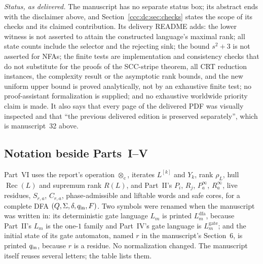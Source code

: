 \documentclass[11pt,letterpaper]{article}
\theoremstyle{definition}
\theoremstyle{remark}
\newcommand{\rec}{\operatorname{Rec}}
\newcommand{\cut}{\otimes_{\mathrm c}}
\newcommand{\gen}[2]{#1^{[#2]}}
\newcommand{\rank}{\rho}
\newcommand{\Lgate}[1]{L^{\mathrm{gate}}_{#1}}
\newcommand{\Ldfa}[1]{L^{\mathrm{dfa}}_{#1}}
\begin{document}
\emph{Status, as delivered.} The manuscript has no separate status box; its
abstract ends with the disclaimer above, and
Section~\ref{ccc:dc:sec:checks} states the scope of its checks and its
claimed contribution. Its delivery README adds: the lower witness is not
asserted to attain the constructed language's maximal rank; all state counts
include the selector and the rejecting sink; the bound $s^2+3$ is not
asserted for NFAs; the finite tests are implementation and consistency
checks that do not substitute for the proofs of the SCC-stripe theorem, all
CRT reduction instances, the complexity result or the asymptotic rank
bounds, and the new uniform upper bound is proved analytically, not by an
exhaustive finite test; no proof-assistant formalization is supplied; and no
exhaustive worldwide priority claim is made. It also says that every page of
the delivered PDF was visually inspected and that ``the previous delivered
edition is preserved separately'', which is manuscript~32 above.

\subsection{Notation beside Parts~I--V}\label{ccc:dc:sec:notation}

Part~VI uses the report's operation $\cut$, iterates $\gen Lk$ and $Y_k$,
rank $\rank_L$, hull $\rec(L)$ and supremum rank $R(L)$, and Part~II's
$P_i$, $R_j$, $P^\infty_a$, $R^\infty_a$, live residues, $S_{r,a}$,
$C_{r,a}$, phase-admissible and liftable words and safe cores, for a complete
DFA $(Q,\Sigma,\delta,q_{\rm in},F)$. Two symbols were renamed when the
manuscript was written in: its deterministic gate language $L_m$ is printed
$\Ldfa m$, because Part~II's $L_m$ is the one-$1$ family and Part~IV's gate
language is $\Lgate m$; and the initial state of its gate automaton, named
$r$ in the manuscript's Section~6, is printed $q_{\rm in}$, because $r$ is a
residue. No normalization changed. The manuscript itself reuses several
letters; the table lists them.
\end{document}
